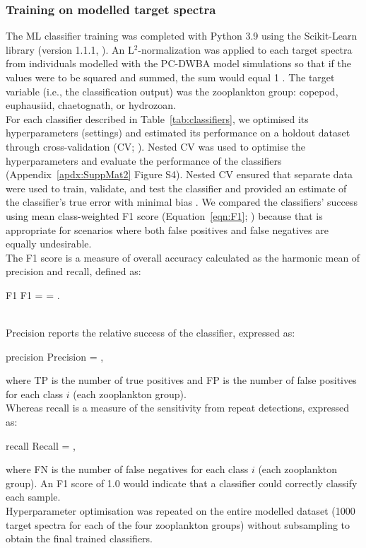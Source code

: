 \subsubsection{Training on modelled target spectra}
The ML classifier training was completed with Python 3.9 using the Scikit-Learn library (version 1.1.1, \citealt{Pedregosa2011}). An L$^2$-normalization was applied to each target spectra from individuals modelled with the PC-DWBA model simulations so that if the values were to be squared and summed, the sum would equal 1 \citep{Komer2014}. The target variable (i.e., the classification output) was the zooplankton group: copepod, euphausiid, chaetognath, or hydrozoan. \\
For each classifier described in Table~\ref{tab:classifiers}, we optimised its hyperparameters (settings) and estimated its performance on a holdout dataset through cross-validation (CV; \citealt{Stone1974}). Nested CV \citep{Wainer2021} was used to optimise the hyperparameters and evaluate the performance of the classifiers (Appendix~\ref{apdx:SuppMat2} Figure S4). Nested CV ensured that separate data were used to train, validate, and test the classifier and provided an estimate of the classifier's true error with minimal bias \citep{Varma2006}. We compared the classifiers' success using mean class-weighted F1 score (Equation~\ref{eqn:F1}; \citealt{Pedregosa2011}) because that is appropriate for scenarios where both false positives and false negatives are equally undesirable. \\
The F1 score is a measure of overall accuracy calculated as the harmonic mean of precision and recall, defined as:
\begin{muneqn}{F1}
F1 =  = .
\end{muneqn}
\\
Precision reports the relative success of the classifier, expressed as:
\begin{muneqn}{precision}
Precision = ,
\end{muneqn}
where TP is the number of true positives and FP is the number of false positives for each class $i$ (each zooplankton group). \\
Whereas recall is a measure of the sensitivity from repeat detections, expressed as:
\begin{muneqn}{recall}
Recall = ,
\end{muneqn}

where FN is the number of false negatives for each class $i$ (each zooplankton group). An F1 score of 1.0 would indicate that a classifier could correctly classify each sample. \\
Hyperparameter optimisation was repeated on the entire modelled dataset (1000 target spectra for each of the four zooplankton groups) without subsampling to obtain the final trained classifiers. 

